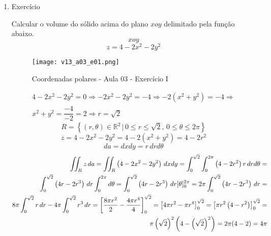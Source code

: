 \begin{enumerate}
	\item Exercício
	
	Calcular o volume do sólido acima do plano $xoy$ delimitado pela função abaixo.
	\begin{equation*}
		xoy
	\end{equation*}
	\begin{equation*}
		z = 4 - 2x^2 - 2y^2
	\end{equation*}
	
	\begin{figure}[htb]
		\caption{Coordenadas polares - Aula 03 - Exercício I}
		\label{v13_a03_e01}
		\centering
		\texttt{[image: v13\_a03\_e01.png]}		
	\end{figure}
	
	\begin{align*}
		4 - 2x^2 - 2y^2 = 0 \Rightarrow -2x^2 - 2y^2 = - 4 \Rightarrow - 2\left(x^2 + y^2\right) = -4 \Rightarrow\\ x^2 + y^2 = \dfrac{-4}{-2} = 2 \Rightarrow r = \sqrt{2}
	\end{align*}
	\begin{equation*}
		R = \left\{(r, \theta) \in \mathbb{R}^2 \,|\, 0 \leq r \leq \sqrt{2},\, 0 \leq \theta \leq 2\pi\right\}
	\end{equation*}
	\begin{equation*}
		z = 4 - 2x^2 - 2y^2 = 4 - 2\left(x^2 + y^2\right) = 4 - 2r^2
	\end{equation*}
	\begin{equation*}
		da = dxdy = r\, drd\theta
	\end{equation*}
	\begin{align*}
		\iint_R z\, da = \iint_R \left(4 - 2x^2 - 2y^2\right)\, dxdy = \int_0^{\sqrt{2}} \int_0^{2\pi} \left(4 - 2r^2\right) r\, drd\theta =\\ \int_0^{\sqrt{2}} \left(4r - 2r^3\right) \, dr \int_0^{2\pi} d\theta = \int_0^{\sqrt{2}} \left(4r - 2r^3\right) \, dr [\theta]_0^{2\pi} = 2\pi\int_0^{\sqrt{2}} \left(4r - 2r^3\right) \, dr =\\ 8\pi\int_0^{\sqrt{2}} r\, dr - 4\pi\int_0^{\sqrt{2}} r^3\, dr = \left[\dfrac{8\pi r^2}{2} - \dfrac{\overstrike{4}\pi r^4}{\overstrike{4}}\right]_0^{\sqrt{2}} = \left[4\pi r^2 - \pi r^4\right]_0^{\sqrt{2}} = \left[\pi r^2\left(4 - r^2\right)\right]_0^{\sqrt{2}} =\\ \pi \left(\sqrt{2}\right)^2\left(4 - \left(\sqrt{2}\right)^2\right) = 2\pi(4 - 2) = 4\pi
	\end{align*}
\end{enumerate}